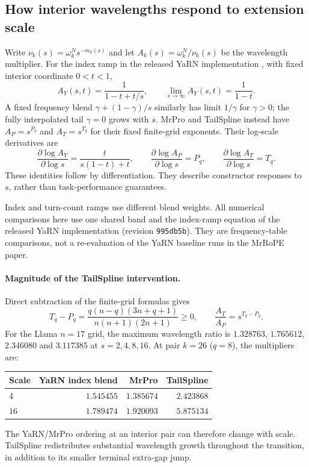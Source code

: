 \subsection{How interior wavelengths respond to extension scale}
\label{sec:allocation-scale-response}
Write $\nu_k(s)=\omega_k^N s^{-m_k(s)}$ and let
$A_k(s)=\omega_k^N/\nu_k(s)$ be the wavelength multiplier.
For the index ramp in the released YaRN implementation
\citep{peng2024yarn}, with fixed interior coordinate $0<t<1$,
\begin{equation}
A_Y(s,t)=\frac{1}{1-t+t/s},\qquad
\lim_{s\to\infty}A_Y(s,t)=\frac{1}{1-t}.
\label{eq:yarn-interior-scale-limit}
\end{equation}
A fixed frequency blend $\gamma+(1-\gamma)/s$ similarly has limit
$1/\gamma$ for $\gamma>0$; the fully interpolated tail $\gamma=0$ grows
with $s$. MrPro and TailSpline instead have
$A_P=s^{P_q}$ and $A_T=s^{T_q}$ for their fixed finite-grid exponents.
Their log-scale derivatives are
\begin{equation}
\frac{\partial\log A_Y}{\partial\log s}
=\frac{t}{s(1-t)+t},\qquad
\frac{\partial\log A_P}{\partial\log s}=P_q,\qquad
\frac{\partial\log A_T}{\partial\log s}=T_q.
\label{eq:allocation-scale-derivatives}
\end{equation}
These identities follow by differentiation. They describe constructor
responses to $s$, rather than task-performance guarantees.

Index and turn-count ramps use different blend weights. All numerical
comparisons here use one shared band and the index-ramp equation of the
released YaRN implementation (revision \texttt{995db5b}).
They are frequency-table comparisons, not a re-evaluation of the YaRN
baseline runs in the MrRoPE paper.

\paragraph{Magnitude of the TailSpline intervention.}
Direct subtraction of the finite-grid formulas gives
\begin{equation}
T_q-P_q=\frac{q(n-q)(3n+q+1)}{n(n+1)(2n+1)}\ge0,
\qquad \frac{A_T}{A_P}=s^{T_q-P_q}.
\label{eq:tailspline-wavelength-order}
\end{equation}
For the Llama $n=17$ grid, the maximum wavelength ratio is
$1.328763$, $1.765612$, $2.346080$ and $3.117385$ at $s=2,4,8,16$.
At pair $k=26$ ($q=8$), the multipliers are:
\begin{center}
\begin{tabular}{@{}lrrr@{}}
\toprule
Scale & YaRN index blend & MrPro & TailSpline\\
\midrule
$4$ & $1.545455$ & $1.385674$ & $2.423868$\\
$16$ & $1.789474$ & $1.920093$ & $5.875134$\\
\bottomrule
\end{tabular}
\end{center}
The YaRN/MrPro ordering at an interior pair can therefore change with
scale. TailSpline redistributes substantial wavelength growth throughout
the transition, in addition to its smaller terminal extra-gap jump.

